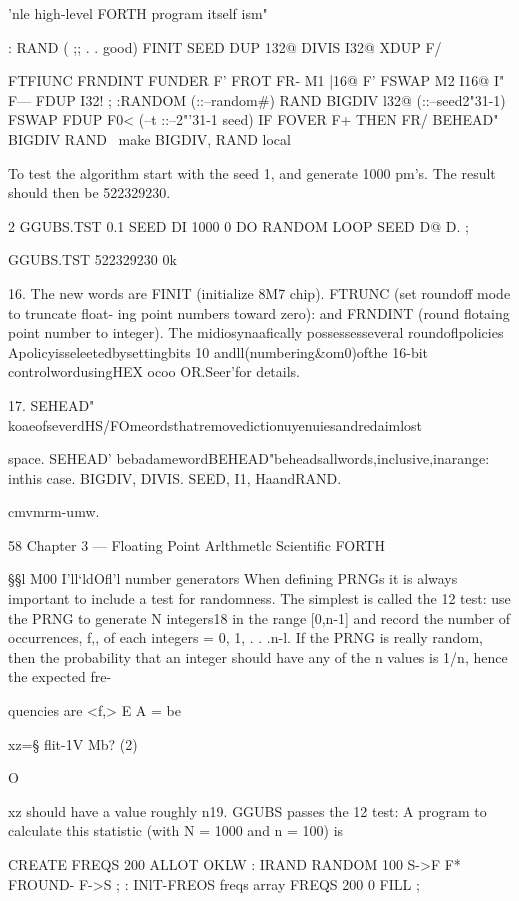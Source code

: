 'nle high-level FORTH program itself ism"

: RAND ( ;; . . good)
FINIT SEED DUP 132@
DIVIS I32@
XDUP F/

FTFIUNC FRNDINT
FUNDER F' FROT FR-
M1 |16@ F'
FSWAP M2 I16@
I" F— FDUP I32! ;
:RANDOM (::--random#)
RAND BIGDIV l32@ (::--seed2"31-1)
FSWAP FDUP F0< (--t ::--2"'31-1 seed)
IF FOVER F+ THEN FR/
BEHEAD" BIGDIV RAND
\ make BIGDIV, RAND local

To test the algorithm start with the seed 1, and generate 1000
pm’s. The result should then be 522329230.

2 GGUBS.TST 0.1 SEED DI
1000 0 DO RANDOM LOOP
SEED D@ D. ;

GGUBS.TST 522329230 0k

 

16. The new words are FINIT (initialize 8M7 chip). FTRUNC (set roundoff mode to truncate ﬂoat-
ing point numbers toward zero): and FRNDINT (round ﬂotaing point number to integer). The
midiosynaafically possessesseveral roundoﬂpolicies Apolicyisseleetedbysettingbits 10
andll(numbering&om0)ofthe 16-bit controlwordusingHEX ocoo OR.Seer’for
details.

17. SEHEAD" koaeofseverdHS/FOmeordsthatremovedictionuyenuiesandredaimlost

space. SEHEAD' bebadamewordBEHEAD"beheadsallwords,inclusive,inarange: inthis
case. BIGDIV, DIVIS. SEED, I1, HaandRAND.

cmvmrm-umw.

58 Chapter 3 — Floating Point Arlthmetlc Scientific FORTH

§§l M00 I'll‘ldOfl'l number generators
When defining PRNGs it is always important to include a test
for randomness. The simplest is called the 12 test: use the
PRNG to generate N integers18 in the range [0,n-1] and record
the number of occurrences, f,, of each integers = 0, 1, . . .n-l. If
the PRNG is really random, then the probability that an integer
should have any of the n values is 1/n, hence the expected fre-

quencies are <f,> E A = %
be

xz=§ ﬂit-1V Mb? (2)

O

xz should have a value roughly n19. GGUBS passes the 12 test: A
program to calculate this statistic (with N = 1000 and n = 100) is

CREATE FREQS 200 ALLOT OKLW
: IRAND RANDOM 100 S->F
F* FROUND- F->S ;
: INlT-FREOS \initialize freqs array
FREQS 200 0 FILL ;


